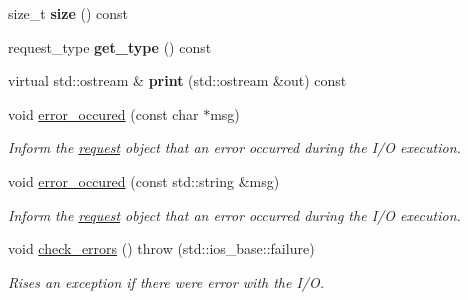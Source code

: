 \begin{CompactItemize}
\item 
\hypertarget{group__iolayer_g9bc852dd0ab2900911465f6a8e03ca6e}{
size\_\-t \textbf{size} () const }
\label{group__iolayer_g9bc852dd0ab2900911465f6a8e03ca6e}

\item 
\hypertarget{group__iolayer_gca7a3651bcfab4842a426399756b47e1}{
request\_\-type \textbf{get\_\-type} () const }
\label{group__iolayer_gca7a3651bcfab4842a426399756b47e1}

\item 
\hypertarget{group__iolayer_gbc1ade28e4e71c83eb166af89898350c}{
virtual std::ostream \& \textbf{print} (std::ostream \&out) const }
\label{group__iolayer_gbc1ade28e4e71c83eb166af89898350c}

\item 
\hypertarget{group__iolayer_gf946fd2411a5b613d195bc46c914facc}{
void \hyperlink{group__iolayer_gf946fd2411a5b613d195bc46c914facc}{error\_\-occured} (const char $\ast$msg)}
\label{group__iolayer_gf946fd2411a5b613d195bc46c914facc}

\begin{CompactList}\small\item\em Inform the \hyperlink{classrequest}{request} object that an error occurred during the I/O execution. \item\end{CompactList}\item 
\hypertarget{group__iolayer_g8bfe152a78eb167f7a07f573614c07b6}{
void \hyperlink{group__iolayer_g8bfe152a78eb167f7a07f573614c07b6}{error\_\-occured} (const std::string \&msg)}
\label{group__iolayer_g8bfe152a78eb167f7a07f573614c07b6}

\begin{CompactList}\small\item\em Inform the \hyperlink{classrequest}{request} object that an error occurred during the I/O execution. \item\end{CompactList}\item 
\hypertarget{group__iolayer_g32dc55876ffe5160f8c037b3c6eaf126}{
void \hyperlink{group__iolayer_g32dc55876ffe5160f8c037b3c6eaf126}{check\_\-errors} ()  throw (std::ios\_\-base::failure)}
\label{group__iolayer_g32dc55876ffe5160f8c037b3c6eaf126}

\begin{CompactList}\small\item\em Rises an exception if there were error with the I/O. \item\end{CompactList}\end{CompactItemize}
